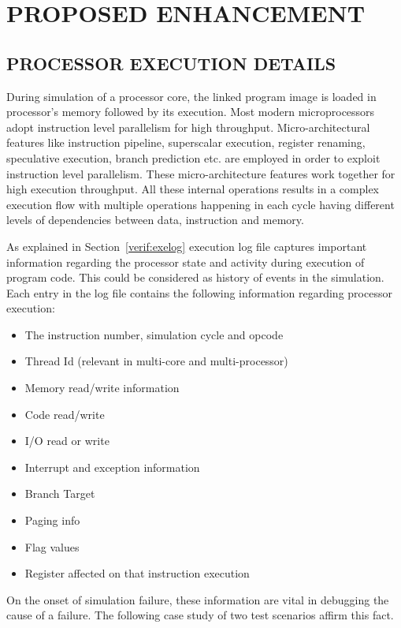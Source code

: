 \chapter{PROPOSED ENHANCEMENT}
\label{chap:enhancement.tex}

\section {PROCESSOR EXECUTION DETAILS}

During simulation of a processor core, the linked program image is loaded in processor's memory followed by its execution. Most modern microprocessors adopt instruction level parallelism for high throughput. Micro-architectural features like instruction pipeline, superscalar execution, register renaming, speculative execution, branch prediction etc. are employed in order to exploit instruction level parallelism.  These micro-architecture features work together for high execution throughput. All these internal operations results in a complex execution flow with multiple operations happening in each cycle having different levels of dependencies between data, instruction and memory.


As explained in Section~\ref{verif:exelog} execution log file captures important information regarding the processor state and activity during execution of program code. This could be considered as history of events in the simulation. Each entry in the log file contains the following information regarding processor execution:
\begin{itemize}
	\item The instruction number, simulation cycle and opcode
	\item Thread Id (relevant in multi-core and multi-processor)
	\item Memory read/write information
	\item Code read/write
	\item I/O read or write
	\item Interrupt and exception information
	\item Branch Target
	\item Paging info
	\item Flag values
	\item Register affected on that instruction execution
\end{itemize}
On the onset of simulation failure, these information are vital in debugging the cause of a failure. The following case study of two test scenarios affirm this fact.

